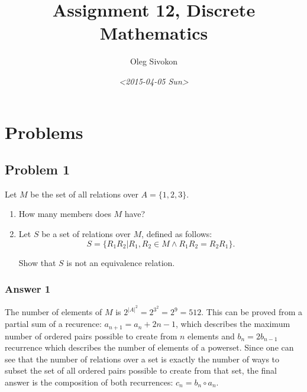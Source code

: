 \documentclass[11pt]{article}
\author{Oleg Sivokon}
\date{\textit{<2015-04-05 Sun>}}
\title{Assignment 12, Discrete Mathematics}
\begin{document}
\maketitle
\tableofcontents



\clearpage

\section{Problems}
\label{sec-1}

\subsection{Problem 1}
\label{sec-1-1}
Let $M$ be the set of all relations over $A=\{1, 2, 3\}$.
\begin{enumerate}
\item How many members does $M$ have?
\item Let $S$ be a set of relations over $M$, defined as follows:
\begin{equation*}
  S=\{R_1R_2 | R_1, R_2 \in M \land R_1R_2 = R_2R_1\}.
\end{equation*}

Show that $S$ is not an equivalence relation.
\end{enumerate}

\subsubsection{Answer 1}
\label{sec-1-1-1}
The number of elements of $M$ is $2^{\left|A\right|^2} = 2^{3^2} = 2^9
    = 512$.  This can be proved from a partial sum of a recurence: $a_{n+1} =
    a_n + 2n - 1$, which describes the maximum number of ordered pairs possible
to create from $n$ elements and $b_n = 2b_{n-1}$ recurrence which describes
the number of elements of a powerset.  Since one can see that the number
of relations over a set is exactly the number of ways to subset the set of
all ordered pairs possible to create from that set, the final answer is
the composition of both recurrences: $c_n=b_n \circ a_n$.
\end{document}
